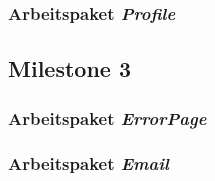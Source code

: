 \subsubsection{Arbeitspaket \emph{Profile}}
\subsection{Milestone 3}\label{subsec:milestone3}

\subsubsection{Arbeitspaket \emph{ErrorPage}}

\subsubsection{Arbeitspaket \emph{Email}}
